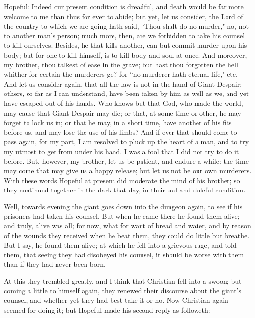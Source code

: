Hopeful: Indeed our present condition is dreadful, and death would be far more welcome to me than thus for ever to abide; but yet, let us consider, the Lord of the country to which we are going hath said, ``Thou shalt do no murder," no, not to another man's person; much more, then, are we forbidden to take his counsel to kill ourselves. Besides, he that kills another, can but commit murder upon his body; but for one to kill himself, is to kill body and soul at once. And moreover, my brother, thou talkest of ease in the grave; but hast thou forgotten the hell whither for certain the murderers go? for ``no murderer hath eternal life," etc. And let us consider again, that all the law is not in the hand of Giant Despair: others, so far as I can understand, have been taken by him as well as we, and yet have escaped out of his hands. Who knows but that God, who made the world, may cause that Giant Despair may die; or that, at some time or other, he may forget to lock us in; or that he may, in a short time, have another of his fits before us, and may lose the use of his limbs? And if ever that should come to pass again, for my part, I am resolved to pluck up the heart of a man, and to try my utmost to get from under his hand. I was a fool that I did not try to do it before. But, however, my brother, let us be patient, and endure a while: the time may come that may give us a happy release; but let us not be our own murderers. With these words Hopeful at present did moderate the mind of his brother; so they continued together in the dark that day, in their sad and doleful condition.

Well, towards evening the giant goes down into the dungeon again, to see if his prisoners had taken his counsel. But when he came there he found them alive; and truly, alive was all; for now, what for want of bread and water, and by reason of the wounds they received when he beat them, they could do little but breathe. But I say, he found them alive; at which he fell into a grievous rage, and told them, that seeing they had disobeyed his counsel, it should be worse with them than if they had never been born.

At this they trembled greatly, and I think that Christian fell into a swoon; but coming a little to himself again, they renewed their discourse about the giant's counsel, and whether yet they had best take it or no. Now Christian again seemed for doing it; but Hopeful made his second reply as followeth:

